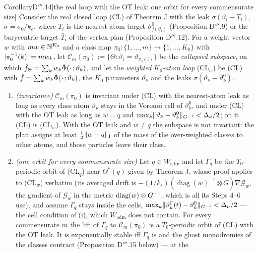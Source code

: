 \begin{thm}{Corollary}{D$'''$.14}[the real loop with the OT leak: one orbit for every commensurate size]
Consider the real closed loop \textup{(CL)} of Theorem J with the leak $\sigma(\vartheta_i - T_i)$,
$\sigma = \sigma_0/k_e$, where $T_i$ is the nearest-atom target $\vartheta^0_{j(\vartheta_i)}$ (Proposition D$'''$.9)
or the barycentric target $\bar T_i$ of the vertex plan (Proposition D$'''$.12). For a weight vector $w$ with
$mw\in\mathbb{N}^{K_0}$ and a class map $\pi_0 : \{1,\dots,m\}\to\{1,\dots,K_0\}$ with $\lvert \pi_0^{-1}(k)\rvert = mw_k$, let
$\mathcal{C}_m(\pi_0) := \{\Theta : \vartheta_i = \vartheta_{\pi_0(i)}\}$ be the \emph{collapsed subspace}, on which
$\hat f_\Theta = \sum_kw_k\tilde\Phi(\cdot\,;\vartheta_k)$, and let the \emph{weighted $K_0$-atom loop}
\textup{(CL$_w$)} be \textup{(CL)} with $\hat f = \sum_kw_k\tilde\Phi(\cdot\,;\vartheta_k)$, the $K_0$ parameters
$\vartheta_k$ and the leaks $\sigma(\vartheta_k - \vartheta^0_k)$.
\begin{enumerate}[label=\textup{(\roman*)}]
  \item \emph{(invariance)} $\mathcal{C}_m(\pi_0)$ is invariant under \textup{(CL)} with the nearest-atom leak as
    long as every class atom $\vartheta_k$ stays in the Voronoi cell of $\vartheta^0_k$, and under \textup{(CL)} with
    the OT leak as long as $w = q$ and $\max_k\lVert \vartheta_k - \vartheta^0_k\rVert_{G^{-1}} < \Delta_\nu/2$; on it
    \textup{(CL)} is \textup{(CL$_w$)}. With the OT leak and $w\ne q$ the subspace is not invariant: the plan
    assigns at least $\frac12\lVert w - q\rVert_1$ of the mass of the over-weighted classes to other atoms, and those
    particles leave their class.
  \item \emph{(one orbit for every commensurate size)} Let $q\in W_{\mathrm{adm}}$ and let $\Gamma_q$ be the
    $T_0$-periodic orbit of \textup{(CL$_q$)} near $\Theta^*(q)$ given by Theorem J, whose proof applies to
    \textup{(CL$_w$)} verbatim (its averaged drift is
    $-(1/k_e)(\operatorname{diag}(w)^{-1}\otimes G)\nabla\mathcal{G}_w$, the gradient of $\mathcal{G}_w$ in the
    metric $\operatorname{diag}(w)\otimes G^{-1}$, which is all its Steps 4--6 use), and assume $\Gamma_q$ stays inside
    the cells, $\max_k\lVert \vartheta^\Gamma_k(t) - \vartheta^0_k\rVert_{G^{-1}} < \Delta_\nu/2$ --- the cell condition of
    (i), which $W_{\mathrm{adm}}$ does not contain. For every commensurate $m$ the lift of $\Gamma_q$ to
    $\mathcal{C}_m(\pi_0)$ is a $T_0$-periodic orbit of \textup{(CL)} with the OT leak. It is exponentially stable
    iff $\Gamma_q$ is and the ghost monodromies of the classes contract (Proposition D$'''$.15 below) --- at the

\end{enumerate}
\end{thm}
